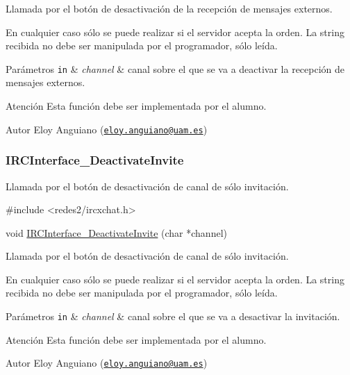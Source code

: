 Llamada por el botón de desactivación de la recepción de mensajes externos.

En cualquier caso sólo se puede realizar si el servidor acepta la orden. La string recibida no debe ser manipulada por el programador, sólo leída.


\begin{DoxyParams}[1]{Parámetros}
\mbox{\tt in}  & {\em channel} & canal sobre el que se va a deactivar la recepción de mensajes externos.\\
\hline
\end{DoxyParams}
\begin{DoxyWarning}{Atención}
Esta función debe ser implementada por el alumno.
\end{DoxyWarning}
\begin{DoxyAuthor}{Autor}
Eloy Anguiano (\href{mailto:eloy.anguiano@uam.es}{\tt eloy.\+anguiano@uam.\+es})
\end{DoxyAuthor}


 \hypertarget{IRCInterface_DeactivateInvite}{}\subsubsection{I\+R\+C\+Interface\+\_\+\+Deactivate\+Invite}\label{IRCInterface_DeactivateInvite}
Llamada por el botón de desactivación de canal de sólo invitación.


\begin{DoxyCode}
\textcolor{preprocessor}{#include <redes2/ircxchat.h>}

\textcolor{keywordtype}{void} \hyperlink{G-2313-06-P2__client_8c_a9ba4e98a3729737aa63ebec54ba4e894}{IRCInterface\_DeactivateInvite} (\textcolor{keywordtype}{char} *channel)
\end{DoxyCode}


Llamada por el botón de desactivación de canal de sólo invitación.

En cualquier caso sólo se puede realizar si el servidor acepta la orden. La string recibida no debe ser manipulada por el programador, sólo leída.


\begin{DoxyParams}[1]{Parámetros}
\mbox{\tt in}  & {\em channel} & canal sobre el que se va a desactivar la invitación.\\
\hline
\end{DoxyParams}
\begin{DoxyWarning}{Atención}
Esta función debe ser implementada por el alumno.
\end{DoxyWarning}
\begin{DoxyAuthor}{Autor}
Eloy Anguiano (\href{mailto:eloy.anguiano@uam.es}{\tt eloy.\+anguiano@uam.\+es})
\end{DoxyAuthor}


